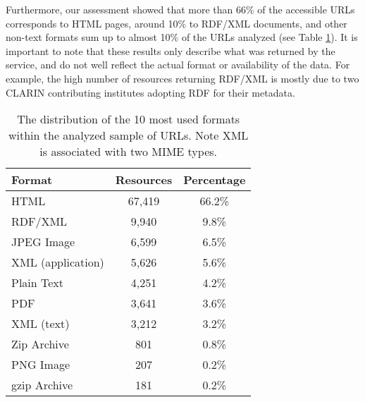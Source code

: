 \documentclass[11pt]{article}
\begin{document}
Furthermore, our
assessment showed that more than 66\% of the accessible URLs corresponds to HTML
pages, around 10\% to RDF/XML documents, and other non-text
formats sum up to almost 10\% of the URLs analyzed 
(see Table \ref{tab:formats}). It is important to note that these results
only describe what was returned by the service, and do not well reflect the
actual format or availability of the data. For example, the high number of
resources returning RDF/XML is mostly due to two CLARIN contributing institutes
adopting RDF for their metadata.

%	
%	
%	
%	

\begin{table}
    \begin{center}
	\begin{tabular}{l|cc}
            Format   & Resources  & Percentage\\
		
		\hline                                              
                HTML                &	67,419 & 66.2\%\\
                RDF/XML             &	9,940  & 9.8\% \\
                JPEG Image          &   6,599  & 6.5\% \\
                XML (application)   &	5,626  & 5.6\% \\
                Plain Text          & 4,251    & 4.2\% \\
                PDF                 &	3,641  & 3.6\% \\
                XML (text)          & 3,212    & 3.2\% \\
                Zip Archive         &	801    & 0.8\% \\
                PNG Image           & 207      & 0.2\% \\
                gzip Archive        & 181      & 0.2\% \\
	\end{tabular}
    \end{center}
	\caption{\label{tab:formats}The distribution of the 10 most used formats within the
        analyzed sample of URLs. Note XML is associated with two MIME types.}
\end{table}
\end{document}

